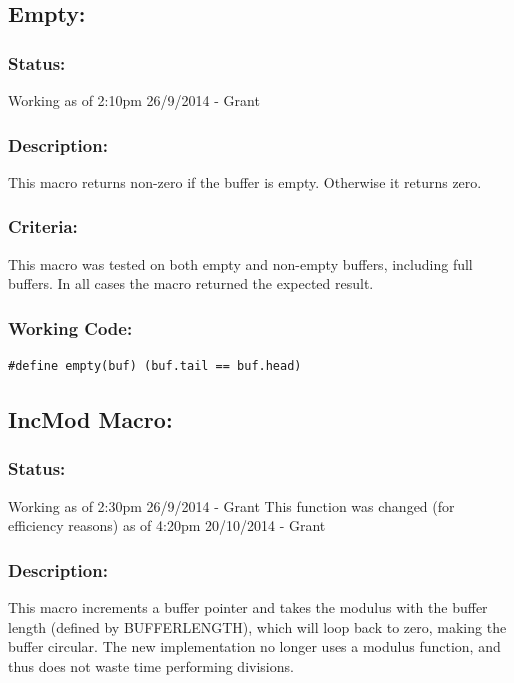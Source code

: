 \documentclass[]{report}
\begin{document}
\subsection{Empty:}
\subsubsection{Status:}
Working as of 2:10pm 26/9/2014 - Grant

\subsubsection{Description:}
This macro returns non-zero if the buffer is empty. Otherwise it returns zero.

\subsubsection{Criteria:}
This macro was tested on both empty and non-empty buffers, including full buffers. In all cases the macro returned the expected result.

\subsubsection{Working Code:}
\begin{lstlisting}
#define empty(buf) (buf.tail == buf.head)
\end{lstlisting}

\subsection{IncMod Macro:}
\subsubsection{Status:}
Working as of 2:30pm 26/9/2014 - Grant\newline
This function was changed (for efficiency reasons) as of 4:20pm 20/10/2014 - Grant

\subsubsection{Description:}
This macro increments a buffer pointer and takes the modulus with the buffer length (defined by BUFFERLENGTH), which will loop back to zero, making the buffer circular. \newline
The new implementation no longer uses a modulus function, and thus does not waste time performing divisions.
\end{document}
